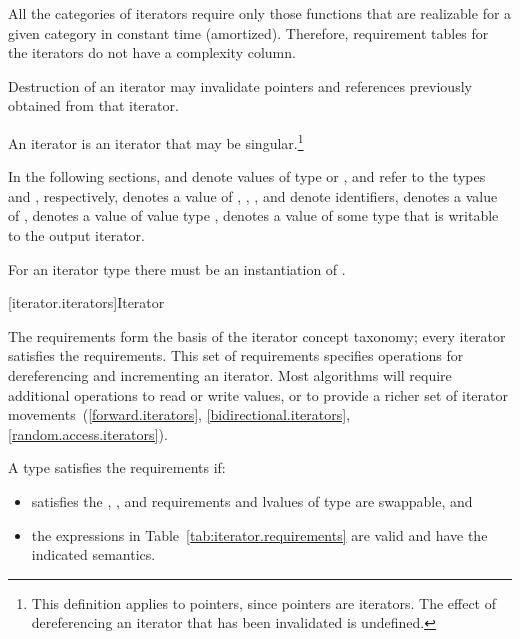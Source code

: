 \pnum
All the categories of iterators require only those functions that are realizable for a given category in
constant time (amortized).
Therefore, requirement tables for the iterators do not have a complexity column.

\pnum
Destruction of an iterator may invalidate pointers and references
previously obtained from that iterator.

\pnum
An
iterator is an iterator that may be singular.\footnote{This definition applies to pointers, since pointers are iterators.
The effect of dereferencing an iterator that has been invalidated
is undefined.
}

\pnum
In the following sections,
and
denote values of type
 or ,
 and  refer to the
types  and
, respectively,
denotes a value of
,
,
,
and
denote identifiers,
denotes a value of
,
denotes a value of value type
,
denotes a value of some type that is writable to the output iterator.
\begin{note} For an iterator type  there must be an instantiation
of . \end{note}

[iterator.iterators]{Iterator}

\pnum
The  requirements form the basis of the iterator concept
taxonomy; every iterator satisfies the  requirements. This
set of requirements specifies operations for dereferencing and incrementing
an iterator. Most algorithms will require additional operations to
read or write values, or
to provide a richer set of iterator movements~(\ref{forward.iterators},
\ref{bidirectional.iterators}, \ref{random.access.iterators}).

\pnum
A type  satisfies the  requirements if:

\begin{itemize}
\item {} satisfies the , , and
 requirements and lvalues
of type  are swappable, and

\item the expressions in Table~\ref{tab:iterator.requirements} are valid and have
the indicated semantics.
\end{itemize}

